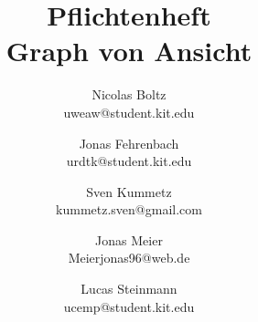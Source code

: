 \documentclass[a4paper]{scrreprt}
\begin{document}
\title{Pflichtenheft\\
Graph von Ansicht}
\date{}
\author{Nicolas Boltz   \\ uweaw@student.kit.edu
  \and Jonas Fehrenbach \\ urdtk@student.kit.edu
  \and Sven Kummetz     \\ kummetz.sven@gmail.com
  \and Jonas Meier      \\ Meierjonas96@web.de
  \and Lucas Steinmann  \\ ucemp@student.kit.edu
}

\titlehead{\texttt{[image: resourcen/GAns.png]}}

\maketitle


\tableofcontents





















\clearpage
\printglossary[type=\acronymtype]
\printglossary[title=Glossar,toctitle=Glossar]

\listoffigures

\end{document}
